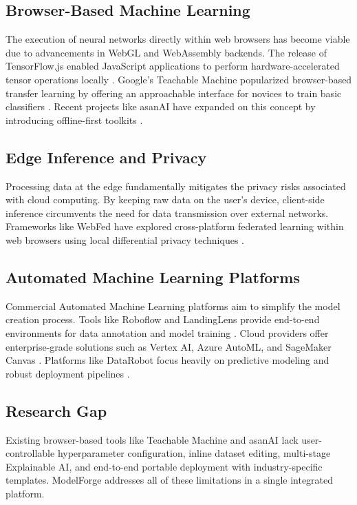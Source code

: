 \documentclass[conference]{IEEEtran}
\begin{document}
\subsection{Browser-Based Machine Learning}
The execution of neural networks directly within web browsers has become viable due to advancements in WebGL and WebAssembly backends. The release of TensorFlow.js enabled JavaScript applications to perform hardware-accelerated tensor operations locally \cite{Smilkov2019}. Google's Teachable Machine popularized browser-based transfer learning by offering an approachable interface for novices to train basic classifiers \cite{Carney2020}. Recent projects like asanAI have expanded on this concept by introducing offline-first toolkits \cite{Koch2025}. 

\subsection{Edge Inference and Privacy}
Processing data at the edge fundamentally mitigates the privacy risks associated with cloud computing. By keeping raw data on the user's device, client-side inference circumvents the need for data transmission over external networks. Frameworks like WebFed have explored cross-platform federated learning within web browsers using local differential privacy techniques \cite{Lian2021}. 

\subsection{Automated Machine Learning Platforms}
Commercial Automated Machine Learning platforms aim to simplify the model creation process. Tools like Roboflow and LandingLens provide end-to-end environments for data annotation and model training \cite{Roboflow, LandingLens}. Cloud providers offer enterprise-grade solutions such as Vertex AI, Azure AutoML, and SageMaker Canvas \cite{VertexAI, AzureAutoML, SageMakerCanvas}. Platforms like DataRobot focus heavily on predictive modeling and robust deployment pipelines \cite{DataRobot}. 

\subsection{Research Gap}
Existing browser-based tools like Teachable Machine and asanAI lack user-controllable hyperparameter configuration, inline dataset editing, multi-stage Explainable AI, and end-to-end portable deployment with industry-specific templates. ModelForge addresses all of these limitations in a single integrated platform.
\end{document}

